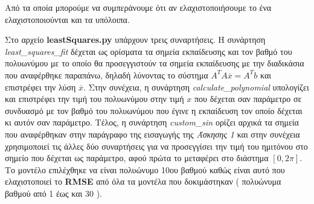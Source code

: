 \documentclass[Second Project.tex]{subfiles}
\begin{document}
Από τα οποία μπορούμε να συμπεράνουμε ότι αν ελαχιστοποιήσουμε το ένα ελαχιστοποιούνται και τα υπόλοιπα.
\par Στο αρχείο \textlatin{\textbf{leastSquares.py}} υπάρχουν τρεις συναρτήσεις. Η συνάρτηση 
\textlatin{\textit{least\_squares\_fit}} δέχεται ως ορίσματα τα σημεία εκπαίδευσης και τον βαθμό του πολυωνύμου με το
οποίο θα προσεγγιστούν τα σημεία εκπαίδευσης με την διαδικάσια που αναφέρθηκε παραπάνω, δηλαδή λύνοντας το σύστημα
$A^{T}A\overline{x} = A^{T}b$ και επιστρέφει την λύση $\overline{x}$. Στην συνέχεια, η συνάρτηση 
\textlatin{\textit{calculate\_polynomial}} υπολογίζει και επιστρέφει την τιμή του πολυωνύμου στην τιμή $x$ που δέχεται
σαν παράμετρο σε συνδυασμό με τον βαθμό του πολυωνύμου που έγινε η εκπαίδευση τον οποίο δέχεται κι αυτόν σαν
παράμετρο.  Τέλος, η συνάρτηση \textlatin{\textit{custom\_sin}} ορίζει αρχικά τα σημεία που αναφέρθηκαν στην παράγραφο
 της εισαγωγής της \textit{Άσκησης 1} και στην συνέχεια χρησιμοποιεί τις άλλες δύο συναρτήσεις για να προσεγγίσει την
  τιμή του ημιτόνου στο σημείο που δέχεται ως παράμετρο, αφού πρώτα το μεταφέρει στο διάστημα $[0,2\pi]$. Το μοντέλο 
επιλέχθηκε να είναι πολυώνυμο 10ου βαθμού καθώς είναι αυτό που ελαχιστοποιεί το \textlatin{\textbf{RMSE}} από όλα τα
μοντέλα που δοκιμάστηκαν ( πολυώνυμα βαθμού από 1 έως και 30 ).
\newpage
\end{document}
